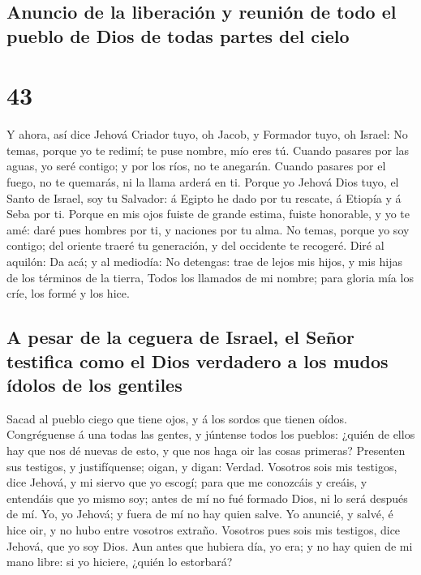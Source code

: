 \hypertarget{anuncio-de-la-liberaciuxf3n-y-reuniuxf3n-de-todo-el-pueblo-de-dios-de-todas-partes-del-cielo}{%
\subsection{Anuncio de la liberación y reunión de todo el pueblo de Dios
de todas partes del
cielo}\label{anuncio-de-la-liberaciuxf3n-y-reuniuxf3n-de-todo-el-pueblo-de-dios-de-todas-partes-del-cielo}}

\hypertarget{section-42}{%
\section{43}\label{section-42}}

 Y ahora, así dice Jehová Criador tuyo, oh Jacob, y Formador
tuyo, oh Israel: No temas, porque yo te redimí; te puse nombre, mío eres
tú.  Cuando pasares por las aguas, yo seré contigo; y por
los ríos, no te anegarán. Cuando pasares por el fuego, no te quemarás,
ni la llama arderá en ti.  Porque yo Jehová Dios tuyo, el
Santo de Israel, soy tu Salvador: á Egipto he dado por tu rescate, á
Etiopía y á Seba por ti.  Porque en mis ojos fuiste de
grande estima, fuiste honorable, y yo te amé: daré pues hombres por ti,
y naciones por tu alma.  No temas, porque yo soy contigo;
del oriente traeré tu generación, y del occidente te recogeré.
 Diré al aquilón: Da acá; y al mediodía: No detengas: trae
de lejos mis hijos, y mis hijas de los términos de la tierra,
 Todos los llamados de mi nombre; para gloria mía los críe,
los formé y los hice.

\hypertarget{a-pesar-de-la-ceguera-de-israel-el-seuxf1or-testifica-como-el-dios-verdadero-a-los-mudos-uxeddolos-de-los-gentiles}{%
\subsection{A pesar de la ceguera de Israel, el Señor testifica como el
Dios verdadero a los mudos ídolos de los
gentiles}\label{a-pesar-de-la-ceguera-de-israel-el-seuxf1or-testifica-como-el-dios-verdadero-a-los-mudos-uxeddolos-de-los-gentiles}}

 Sacad al pueblo ciego que tiene ojos, y á los sordos que
tienen oídos.  Congréguense á una todas las gentes, y
júntense todos los pueblos: ¿quién de ellos hay que nos dé nuevas de
esto, y que nos haga oir las cosas primeras? Presenten sus testigos, y
justifíquense; oigan, y digan: Verdad.  Vosotros sois mis
testigos, dice Jehová, y mi siervo que yo escogí; para que me conozcáis
y creáis, y entendáis que yo mismo soy; antes de mí no fué formado Dios,
ni lo será después de mí.  Yo, yo Jehová; y fuera de mí no
hay quien salve.  Yo anuncié, y salvé, é hice oir, y no
hubo entre vosotros extraño. Vosotros pues sois mis testigos, dice
Jehová, que yo soy Dios.  Aun antes que hubiera día, yo
era; y no hay quien de mi mano libre: si yo hiciere, ¿quién lo
estorbará?

